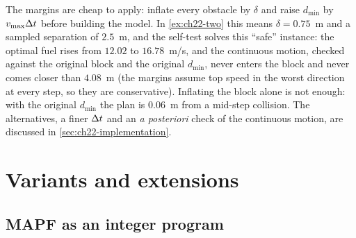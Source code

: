 The margins are cheap to apply: inflate every obstacle by $\delta$ and
raise $d_{\min}$ by $v_{\max}\Delta t$ before building the model. In
\cref{ex:ch22-two} this means $\delta = 0.75$~m and a sampled separation
of $2.5$~m, and the self-test solves this ``safe'' instance: the optimal
fuel rises from $12.02$ to $16.78$~m/s, and the continuous motion, checked
against the original block and the original $d_{\min}$, never enters the
block and never comes closer than $4.08$~m (the margins assume top speed in
the worst direction at every step, so they are conservative). Inflating the
block alone is not enough: with the original $d_{\min}$ the plan is $0.06$~m
from a mid-step collision. The alternatives, a finer $\Delta t$ and an
\emph{a posteriori} check of the continuous motion, are discussed in
\cref{sec:ch22-implementation}.

\section{Variants and extensions}
\label{sec:ch22-variants}

\subsection{MAPF as an integer program}
\label{sec:ch22-mapf-ilp}

